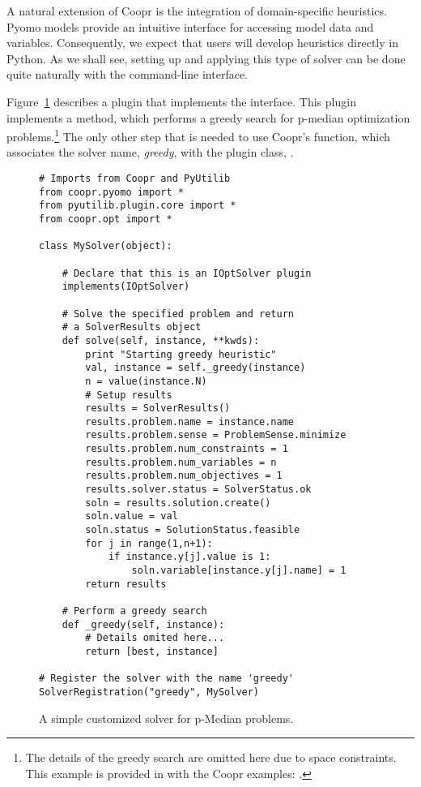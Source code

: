 A natural extension of Coopr is the integration of domain-specific
heuristics.  Pyomo models provide an intuitive interface for accessing
model data and variables.  Consequently, we expect that users will develop heuristics directly in Python.  As we shall see, setting up and applying 
this type of solver can be done quite naturally with the  command-line interface.

Figure~\ref{fig:greedy} describes a plugin that implements the  interface.  This plugin implements a  method,
which performs a greedy search for p-median optimization problems.\footnote{The details of the greedy search are omitted here due to space constraints.  This
example is provided in with the Coopr examples: .}  The only other step that is needed to use Coopr's  function, which associates the solver name, \textit{greedy}, with the plugin class, .


\begin{figure}
\begin{lstlisting}
# Imports from Coopr and PyUtilib
from coopr.pyomo import *
from pyutilib.plugin.core import *
from coopr.opt import *

class MySolver(object):

    # Declare that this is an IOptSolver plugin
    implements(IOptSolver)

    # Solve the specified problem and return
    # a SolverResults object
    def solve(self, instance, **kwds):
        print "Starting greedy heuristic"
        val, instance = self._greedy(instance)
        n = value(instance.N)
        # Setup results
        results = SolverResults()
        results.problem.name = instance.name
        results.problem.sense = ProblemSense.minimize
        results.problem.num_constraints = 1
        results.problem.num_variables = n
        results.problem.num_objectives = 1
        results.solver.status = SolverStatus.ok
        soln = results.solution.create()
        soln.value = val
        soln.status = SolutionStatus.feasible
        for j in range(1,n+1):
            if instance.y[j].value is 1:
                soln.variable[instance.y[j].name] = 1
        return results

    # Perform a greedy search
    def _greedy(self, instance):
        # Details omited here...
        return [best, instance]

# Register the solver with the name 'greedy'
SolverRegistration("greedy", MySolver)
\end{lstlisting}
\caption{\label{fig:greedy} A simple customized solver for p-Median problems.}
\end{figure}


